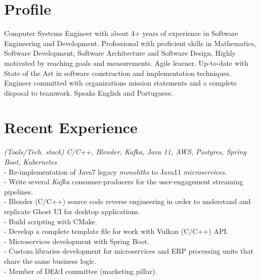 \documentclass[]{CV-JuanCamiloFlorez}
\begin{document}
\begin{minipage}[t]{0.66\textwidth} 


\section{Profile}
Computer Systems Engineer with about 4+ years of experience in Software Engineering and Development. Professional with proficient skills in Mathematics, Software Development, Software Architecture and Software Design. Highly motivated by reaching goals and measurements. Agile learner. Up-to-date with State of the Art in software construction and implementation techniques. Engineer committed with organizations mission statements and a complete disposal to teamwork. Speaks English and Portuguese.


\sectionsep

\section{Recent Experience}
    \textit{(Tools/Tech. stack) C/C++, Blender, Kafka, Java 11, AWS, Postgres, Spring Boot, Kubernetes} \\
        - Re-implementation of Java7 legacy \textit{monoliths} to Java11 \textit{microservices}. \\
        - Write several \textit{Kafka} consumer-producers for the user-engagement streaming pipelines. \\
        - Blender (C/C++) source code reverse engineering in order to understand and replicate Ghost UI for desktop applications. \\
        - Build scripting with CMake. \\
        - Develop a complete template file for work with Vulkan (C/C++) API. \\
        - Microservices development with Spring Boot. \\
        - Custom libraries development for microservices and ERP processing units that share the same business logic. \\
        - Member of DE\&I committee (marketing pillar). \\
        \sectionsep


\end{minipage}
\end{document}
